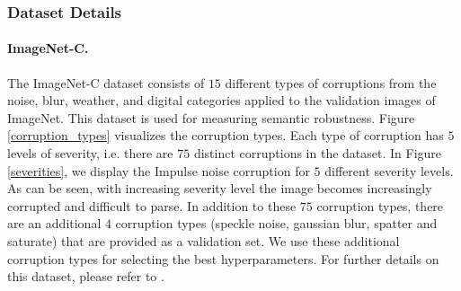 \documentclass{article}
\begin{document}
\subsubsection{Dataset Details} \label{sec:robust_app.data}

\paragraph{ImageNet-C.} 
The ImageNet-C dataset \citep{hendrycks2019robustness} consists of $15$ different types of corruptions
from the noise, blur, weather, and digital categories applied to the validation images of ImageNet.
This dataset is used for measuring semantic robustness.
Figure \ref{corruption_types} visualizes the corruption types.
Each type of corruption has $5$ levels of severity, i.e. there are $75$ distinct corruptions in the dataset.
In Figure \ref{severities}, we display the Impulse noise corruption for $5$ different severity levels. 
As can be seen, with increasing severity level the image becomes increasingly corrupted and difficult to parse.
In addition to these $75$ corruption types, there are an additional $4$ corruption types (speckle noise, gaussian blur, spatter and saturate) that are provided as a validation set.
We use these additional corruption types for selecting the best hyperparameters.
For further details on this dataset, please refer to \citep{hendrycks2019robustness}.
\end{document}
